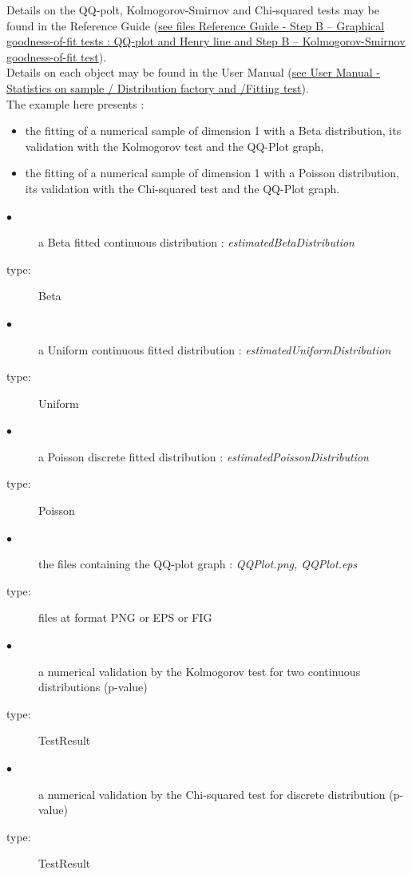 Details on the QQ-polt, Kolmogorov-Smirnov and  Chi-squared tests may be found in the Reference Guide (\href{OpenTURNS_ReferenceGuide.pdf}{see files Reference Guide - Step B --  Graphical goodness-of-fit tests : QQ-plot and Henry line and Step B -- Kolmogorov-Smirnov goodness-of-fit test}).\\

Details on each object may be found in the User Manual  (\href{OpenTURNS_UserManual_TUI.pdf}{see User Manual - Statistics on sample /  Distribution factory and /Fitting test}).\\



The example here presents :
\begin{itemize}
\item the fitting of a numerical sample of dimension 1 with a Beta distribution, its validation with the Kolmogorov test and the  QQ-Plot graph,
\item the fitting of a numerical sample of dimension 1 with a Poisson distribution, its validation with the Chi-squared test and the  QQ-Plot graph.
\end{itemize}


{
  \begin{description}
  \item[$\bullet$] a Beta fitted continuous distribution : {\itshape estimatedBetaDistribution}
  \item[type:] Beta
  \item[$\bullet$] a Uniform continuous fitted distribution : {\itshape estimatedUniformDistribution}
  \item[type:] Uniform
  \item[$\bullet$] a Poisson discrete fitted distribution : {\itshape estimatedPoissonDistribution}
  \item[type:] Poisson
  \item[$\bullet$] the files containing the QQ-plot graph : {\itshape QQPlot.png, QQPlot.eps}
  \item[type:] files at format PNG or EPS or FIG
  \item[$\bullet$] a numerical validation by the Kolmogorov test for two continuous distributions (p-value)
  \item[type:] TestResult
  \item[$\bullet$] a numerical validation by the Chi-squared test for  discrete distribution (p-value)
  \item[type:] TestResult
  \end{description}
}

